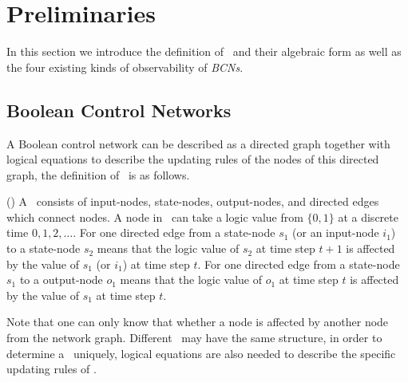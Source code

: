 \section{Preliminaries} 
\label{sec:pre}
In this section we introduce the definition of \BCNs\ and their algebraic form as well as the four existing kinds of observability of {\em BCNs}.



\subsection{Boolean Control Networks}

A Boolean control network can be described as a directed graph together with logical equations to describe the updating rules of the nodes of this directed graph, the definition of \BCN\ is as follows. 

\begin{definition}
(\cite{Ideker2001A}) A \BCN\ consists of input-nodes, state-nodes, output-nodes, and directed edges which connect nodes. A node in \BCN\ can take a logic value from $\{0,1\}$ at a discrete time $0, 1, 2,\ldots$. For one directed edge from a state-node $s_1$ (or an input-node $i_1$) to a state-node $s_2$ means that the logic value of $s_2$ at time step $t+1$ is affected by the value of $s_1$ (or $i_1$)  at time step $t$. For one directed edge from a state-node $s_1$ to a output-node $o_1$ means that the logic value of $o_1$ at time step $t$ is affected by the value of $s_1$  at time step $t$. 
\end{definition}


Note that one can only know that whether a node is affected by another node from the network graph. Different \BCNs\ may have the same structure, in order to determine a \BCN\ uniquely, logical equations are also needed to describe the specific updating rules of \BCNs.


